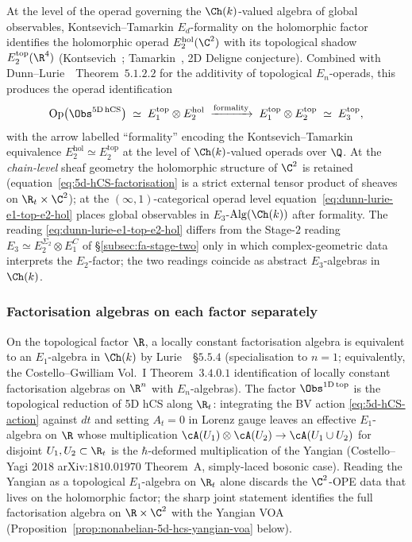 At the level of the operad governing the $\Ch(k)$-valued algebra of
global observables, Kontsevich--Tamarkin $E_d$-formality on the
holomorphic factor identifies the holomorphic operad
$E_2^{\mathrm{hol}}(\C^2)$ with its topological shadow
$E_2^{\mathrm{top}}(\R^4)$ (Kontsevich~\cite{Kontsevich1999};
Tamarkin~\cite{Tamarkin2007}, 2D Deligne conjecture). Combined with
Dunn--Lurie~\cite{LurieHA}~Theorem~$5.1.2.2$ for the additivity of
topological $E_n$-operads, this produces the operad identification
\begin{equation}
\label{eq:dunn-lurie-e1-top-e2-hol}
 \mathrm{Op}\bigl(\Obs^{\mathrm{5D\,hCS}}\bigr)
 \;\simeq\;
 E_1^{\mathrm{top}} \otimes E_2^{\mathrm{hol}}
 \;\xrightarrow{\mathrm{formality}}\;
 E_1^{\mathrm{top}} \otimes E_2^{\mathrm{top}}
 \;\simeq\; E_3^{\mathrm{top}},
\end{equation}
with the arrow labelled ``formality'' encoding the
Kontsevich--Tamarkin equivalence $E_2^{\mathrm{hol}} \simeq
E_2^{\mathrm{top}}$ at the level of $\Ch(k)$-valued operads over
$\Q$. At the \emph{chain-level} sheaf geometry the holomorphic
structure of $\C^2$ is retained (equation~\eqref{eq:5d-hCS-factorisation}
is a strict external tensor product of sheaves on
$\R_t \times \C^2$); at the $(\infty, 1)$-categorical operad level
equation~\eqref{eq:dunn-lurie-e1-top-e2-hol} places global observables
in $E_3$-$\mathrm{Alg}(\Ch(k))$ after formality. The reading
\eqref{eq:dunn-lurie-e1-top-e2-hol} differs from the Stage-$2$
reading $E_3 \simeq E_2^{\Sigma_2} \otimes E_1^{C}$ of
\S\ref{subsec:fa-stage-two} only in which complex-geometric data
interprets the $E_2$-factor; the two readings coincide as abstract
$E_3$-algebras in $\Ch(k)$.

\subsubsection{Factorisation algebras on each factor separately}

On the topological factor $\R$, a locally constant factorisation algebra
is equivalent to an $E_1$-algebra in $\Ch(k)$ by
Lurie~\cite{LurieHA}~\S$5.5.4$ (specialisation to $n = 1$; equivalently,
the Costello--Gwilliam \cite{CostelloGwilliam} Vol.~I Theorem~$3.4.0.1$
identification of locally constant factorisation algebras on
$\R^n$ with $E_n$-algebras). The factor $\Obs^{\mathrm{1D\,top}}$
is the topological reduction of 5D hCS along $\R_t$: integrating the
BV action \eqref{eq:5d-hCS-action} against $dt$ and setting
$A_t = 0$ in Lorenz gauge leaves an effective $E_1$-algebra on $\R$
whose multiplication $\cA(U_1) \otimes \cA(U_2) \to \cA(U_1 \cup U_2)$
for disjoint $U_1, U_2 \subset \R_t$ is the $\hbar$-deformed
multiplication of the Yangian (Costello--Yagi $2018$
arXiv:$1810.01970$ Theorem~A, simply-laced bosonic case). Reading the Yangian as a topological
$E_1$-algebra on $\R_t$ alone discards the $\C^2$-OPE data that lives
on the holomorphic factor; the sharp joint statement identifies the
full factorisation algebra on $\R \times \C^2$ with the Yangian VOA
(Proposition~\ref{prop:nonabelian-5d-hcs-yangian-voa} below).

